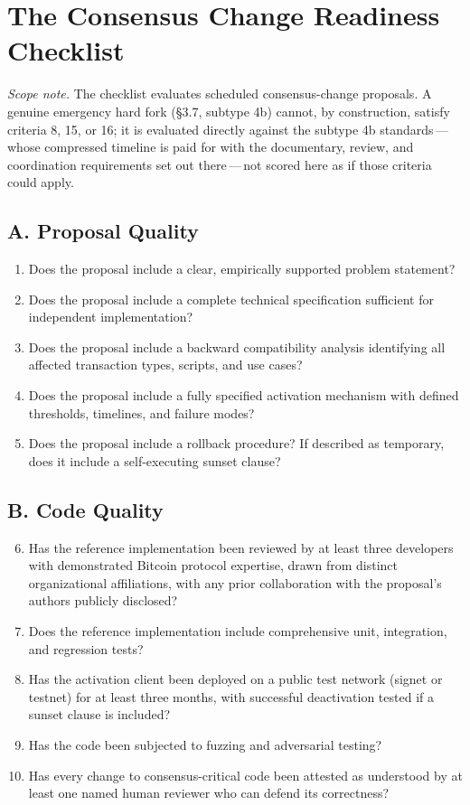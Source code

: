\documentclass[11pt, twoside, openright]{book}
\newcommand{\sect}[1]{\S#1}
\begin{document}
\section{The Consensus Change Readiness Checklist}

\textit{Scope note.} The checklist evaluates scheduled consensus-change proposals. A genuine emergency hard fork (\sect{3.7}, subtype 4b) cannot, by construction, satisfy criteria 8, 15, or 16; it is evaluated directly against the subtype 4b standards\,---\,whose compressed timeline is paid for with the documentary, review, and coordination requirements set out there\,---\,not scored here as if those criteria could apply.

\subsection*{A. Proposal Quality}
\begin{enumerate}
  \item Does the proposal include a clear, empirically supported problem statement?
  \item Does the proposal include a complete technical specification sufficient for independent implementation?
  \item Does the proposal include a backward compatibility analysis identifying all affected transaction types, scripts, and use cases?
  \item Does the proposal include a fully specified activation mechanism with defined thresholds, timelines, and failure modes?
  \item Does the proposal include a rollback procedure? If described as temporary, does it include a self-executing sunset clause?
\end{enumerate}

\subsection*{B. Code Quality}
\begin{enumerate}\setcounter{enumi}{5}
  \item Has the reference implementation been reviewed by at least three developers with demonstrated Bitcoin protocol expertise, drawn from distinct organizational affiliations, with any prior collaboration with the proposal's authors publicly disclosed?
  \item Does the reference implementation include comprehensive unit, integration, and regression tests?
  \item Has the activation client been deployed on a public test network (signet or testnet) for at least three months, with successful deactivation tested if a sunset clause is included?
  \item Has the code been subjected to fuzzing and adversarial testing?
  \item Has every change to consensus-critical code been attested as understood by at least one named human reviewer who can defend its correctness?
\end{enumerate}
\end{document}

